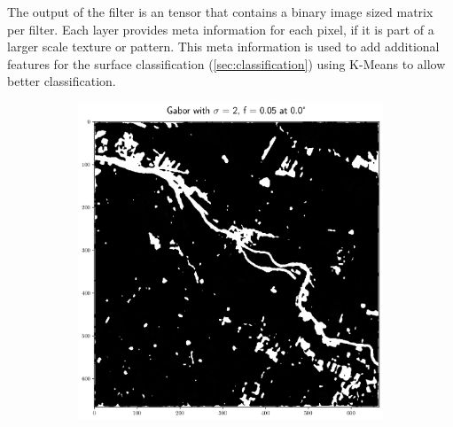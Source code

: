 \documentclass[12pt,a4paper, english]{article}
\begin{document}
    The output of the filter is an tensor that contains a binary image sized matrix per filter. Each layer provides meta information for each pixel, if it is part of a larger scale texture or pattern. 
    This meta information is used to add additional features for the surface classification (\cref{sec:classification}) using K-Means %
    to allow better classification.%
    \begin{figure}[!htbp]
       \centering
     \begin{subfigure}[b]{0.45\textwidth}
         \centering
         \includegraphics[width=\textwidth]{img/Features_2_005_0.png}
         \label{fig:feat01}
     \end{subfigure}
     \hfill
     \begin{subfigure}[b]{0.45\textwidth}
         \centering

\end{subfigure}
\end{figure}
\end{document}
